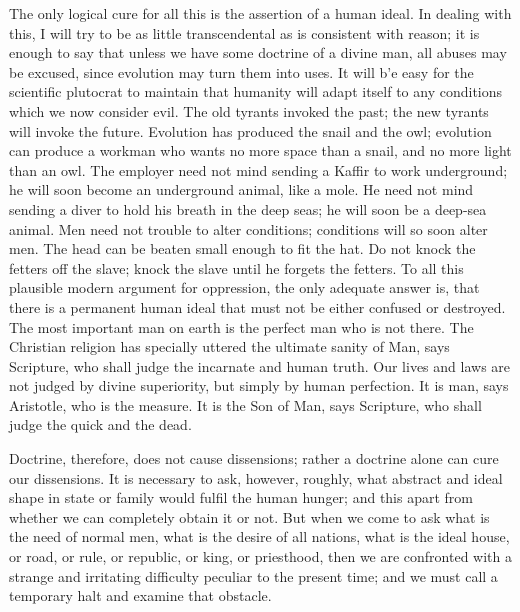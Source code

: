 \documentclass{book}
\begin{document}
The only logical cure for all this is the assertion of a human ideal. In dealing with this, I will try to be as little transcendental as is consistent with reason; it is enough to say that unless we have some doctrine of a divine man, all abuses may be excused, since evolution may turn them into uses. It will b’e easy for the scientific plutocrat to maintain that humanity will adapt itself to any conditions which we now consider evil. The old tyrants invoked the past; the new tyrants will invoke the future. Evolution has produced the snail and the owl; evolution can produce a workman who wants no more space than a snail, and no more light than an owl. The employer need not mind sending a Kaffir to work underground; he will soon become an underground animal, like a mole. He need not mind sending a diver to hold his breath in the deep seas; he will soon be a deep-sea animal. Men need not trouble to alter conditions; conditions will so soon alter men. The head can be beaten small enough to fit the hat. Do not knock the fetters off the slave; knock the slave until he forgets the fetters. To all this plausible modern argument for oppression, the only adequate answer is, that there is a permanent human ideal that must not be either confused or destroyed. The most important man on earth is the perfect man who is not there. The Christian religion has specially uttered the ultimate sanity of Man, says Scripture, who shall judge the incarnate and human truth. Our lives and laws are not judged by divine superiority, but simply by human perfection. It is man, says Aristotle, who is the measure. It is the Son of Man, says Scripture, who shall judge the quick and the dead.

Doctrine, therefore, does not cause dissensions; rather a doctrine alone can cure our dissensions. It is necessary to ask, however, roughly, what abstract and ideal shape in state or family would fulfil the human hunger; and this apart from whether we can completely obtain it or not. But when we come to ask what is the need of normal men, what is the desire of all nations, what is the ideal house, or road, or rule, or republic, or king, or priesthood, then we are confronted with a strange and irritating difficulty peculiar to the present time; and we must call a temporary halt and examine that obstacle.
\end{document}
